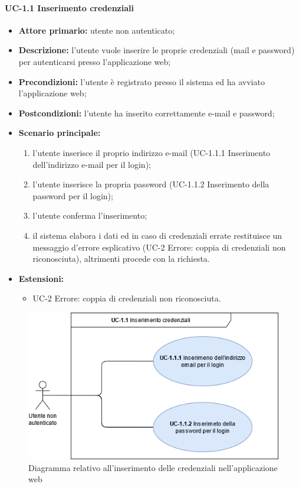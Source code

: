   \paragraph{UC-1.1 Inserimento credenziali}
  \begin{itemize}
    \item \textbf{Attore primario:} utente non autenticato;
  
    \item \textbf{Descrizione:} l'utente vuole inserire le proprie credenziali (mail e password) per autenticarsi presso l'applicazione web;
  
    \item \textbf{Precondizioni:} l'utente è registrato presso il sistema ed ha avviato l'applicazione web;
  
    \item \textbf{Postcondizioni:} l'utente ha inserito correttamente e-mail e password;
  
    \item \textbf{Scenario principale:}
          \begin{enumerate}
            \item l'utente inserisce il proprio indirizzo e-mail (UC-1.1.1 Inserimento dell'indirizzo e-mail per il login);
            \item l'utente inserisce la propria password (UC-1.1.2 Inserimento della password per il login);
            \item l'utente conferma l'inserimento;
            \item il sistema elabora i dati ed in caso di credenziali errate restituisce un messaggio d'errore esplicativo (UC-2 Errore: coppia di credenziali non riconosciuta), altrimenti procede con la richiesta.
          \end{enumerate}
    \item \textbf{Estensioni:}
      \begin{itemize}
            \item UC-2 Errore: coppia di credenziali non riconosciuta.
          \end{itemize}
  \end{itemize}
  
\begin{figure}[H]
    \centering
      \includegraphics[scale=0.50]{src/CasiDUso/immagini/InserimentoCredenzialiWeb.png}
    \caption{Diagramma relativo all'inserimento delle credenziali nell'applicazione web}
\end{figure}
  

